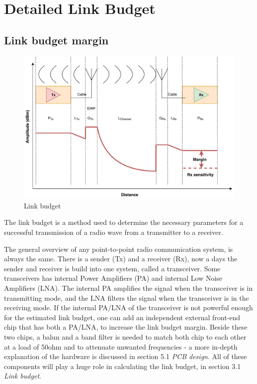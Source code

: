 \section{Detailed Link Budget}
\subsection{Link budget margin}





\begin{figure}[h]
\centering
\hspace*{-2cm}
\includegraphics[scale=1.1]{figures/link_budget.pdf}
\caption{Link budget}
\end{figure}

The link budget is a method used to determine the necessary parameters for a successful transmission of a radio wave from a transmitter to a receiver.  

The general overview of any point-to-point radio communication system, is always the same. There is a sender (Tx) and a receiver (Rx), now a days the sender and receiver is build into one system, called a transceiver. Some transceivers has internal Power Amplifiers (PA) and internal Low Noise Amplifiers (LNA). The internal PA amplifies the signal when the transceiver is in transmitting mode, and the LNA filters the signal when the transceiver is in the receiving mode. If the internal PA/LNA of the transceiver is not powerful enough for the estimated link budget, one can add an independent external front-end chip that has both a PA/LNA, to increase the link budget margin. Beside these two chips, a balun and a band filter is needed to match both chip to each other at a load of 50ohm and to attenuate unwanted frequencies - a more in-depth explanation of the hardware is discussed in section 5.1 \textit{PCB design}. All of these components will play a huge role in calculating the link budget, in section 3.1 \textit{Link budget}. 

